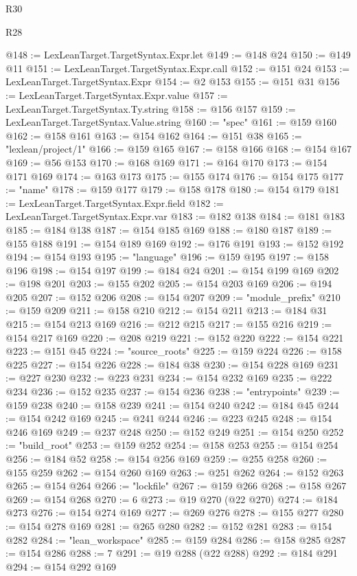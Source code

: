 \begin{lexlean}{R30}
\begin{lexlean}{R28}
\begin{coremodule}
{{{{{{{{{{{{{{{{{{{{{{{{{{{{{{{{{{{{{{{{{{{{{{{{{{{{{{{{{{{{{{{{{{{{{{{{{{{{{{{{{{{{{{{{{{{{{{{{{{{{{{{{{{{{{{{{{{{{{{{{{{{{{{{{{{{{{{{{{{{{{{{@148 := LexLeanTarget.TargetSyntax.Expr.let
@149 := @148 @24
@150 := @149 @11
@151 := LexLeanTarget.TargetSyntax.Expr.call
@152 := @151 @24
@153 := LexLeanTarget.TargetSyntax.Expr
@154 := @2 @153
@155 := @151 @31
@156 := LexLeanTarget.TargetSyntax.Expr.value
@157 := LexLeanTarget.TargetSyntax.Ty.string
@158 := @156 @157
@159 := LexLeanTarget.TargetSyntax.Value.string
@160 := "spec"
@161 := @159 @160
@162 := @158 @161
@163 := @154 @162
@164 := @151 @38
@165 := "lexlean/project/1"
@166 := @159 @165
@167 := @158 @166
@168 := @154 @167
@169 := @56 @153
@170 := @168 @169
@171 := @164 @170
@173 := @154 @171 @169
@174 := @163 @173
@175 := @155 @174
@176 := @154 @175
@177 := "name"
@178 := @159 @177
@179 := @158 @178
@180 := @154 @179
@181 := LexLeanTarget.TargetSyntax.Expr.field
@182 := LexLeanTarget.TargetSyntax.Expr.var
@183 := @182 @138
@184 := @181 @183
@185 := @184 @138
@187 := @154 @185 @169
@188 := @180 @187
@189 := @155 @188
@191 := @154 @189 @169
@192 := @176 @191
@193 := @152 @192
@194 := @154 @193
@195 := "language"
@196 := @159 @195
@197 := @158 @196
@198 := @154 @197
@199 := @184 @24
@201 := @154 @199 @169
@202 := @198 @201
@203 := @155 @202
@205 := @154 @203 @169
@206 := @194 @205
@207 := @152 @206
@208 := @154 @207
@209 := "module_prefix"
@210 := @159 @209
@211 := @158 @210
@212 := @154 @211
@213 := @184 @31
@215 := @154 @213 @169
@216 := @212 @215
@217 := @155 @216
@219 := @154 @217 @169
@220 := @208 @219
@221 := @152 @220
@222 := @154 @221
@223 := @151 @45
@224 := "source_roots"
@225 := @159 @224
@226 := @158 @225
@227 := @154 @226
@228 := @184 @38
@230 := @154 @228 @169
@231 := @227 @230
@232 := @223 @231
@234 := @154 @232 @169
@235 := @222 @234
@236 := @152 @235
@237 := @154 @236
@238 := "entrypoints"
@239 := @159 @238
@240 := @158 @239
@241 := @154 @240
@242 := @184 @45
@244 := @154 @242 @169
@245 := @241 @244
@246 := @223 @245
@248 := @154 @246 @169
@249 := @237 @248
@250 := @152 @249
@251 := @154 @250
@252 := "build_root"
@253 := @159 @252
@254 := @158 @253
@255 := @154 @254
@256 := @184 @52
@258 := @154 @256 @169
@259 := @255 @258
@260 := @155 @259
@262 := @154 @260 @169
@263 := @251 @262
@264 := @152 @263
@265 := @154 @264
@266 := "lockfile"
@267 := @159 @266
@268 := @158 @267
@269 := @154 @268
@270 := 6
@273 := @19 @270 (@22 @270)
@274 := @184 @273
@276 := @154 @274 @169
@277 := @269 @276
@278 := @155 @277
@280 := @154 @278 @169
@281 := @265 @280
@282 := @152 @281
@283 := @154 @282
@284 := "lean_workspace"
@285 := @159 @284
@286 := @158 @285
@287 := @154 @286
@288 := 7
@291 := @19 @288 (@22 @288)
@292 := @184 @291
@294 := @154 @292 @169
}}}}}}}}}}}}}}}}}}}}}}}}}}}}}}}}}}}}}}}}}}}}}}}}}}}}}}}}}}}}}}}}}}}}}}}}}}}}}}}}}}}}}}}}}}}}}}}}}}}}}}}}}}}}}}}}}}}}}}}}}}}}}}}}}}}}}}}}}}}}}}}
\end{coremodule}
\end{lexlean}
\end{lexlean}
